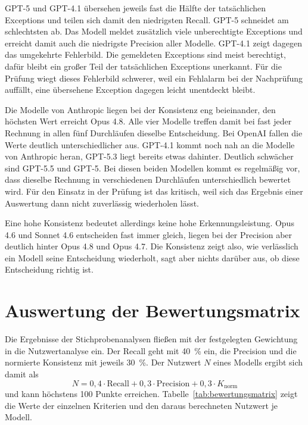 GPT-5 und GPT-4.1 übersehen jeweils fast die Hälfte der tatsächlichen Exceptions und teilen sich damit den niedrigsten Recall. GPT-5 schneidet am schlechtsten ab. Das Modell meldet zusätzlich viele unberechtigte Exceptions und erreicht damit auch die niedrigste Precision aller Modelle. GPT-4.1 zeigt dagegen das umgekehrte Fehlerbild. Die gemeldeten Exceptions sind meist berechtigt, dafür bleibt ein großer Teil der tatsächlichen Exceptions unerkannt. Für die Prüfung wiegt dieses Fehlerbild schwerer, weil ein Fehlalarm bei der Nachprüfung auffällt, eine übersehene Exception dagegen leicht unentdeckt bleibt.

Die Modelle von Anthropic liegen bei der Konsistenz eng beieinander, den höchsten Wert erreicht Opus 4.8. Alle vier Modelle treffen damit bei fast jeder Rechnung in allen fünf Durchläufen dieselbe Entscheidung. Bei OpenAI fallen die Werte deutlich unterschiedlicher aus. GPT-4.1 kommt noch nah an die Modelle von Anthropic heran, GPT-5.3 liegt bereits etwas dahinter. Deutlich schwächer sind GPT-5.5 und GPT-5. Bei diesen beiden Modellen kommt es regelmäßig vor, dass dieselbe Rechnung in verschiedenen Durchläufen unterschiedlich bewertet wird. Für den Einsatz in der Prüfung ist das kritisch, weil sich das Ergebnis einer Auswertung dann nicht zuverlässig wiederholen lässt.

Eine hohe Konsistenz bedeutet allerdings keine hohe Erkennungsleistung. Opus 4.6 und Sonnet 4.6 entscheiden fast immer gleich, liegen bei der Precision aber deutlich hinter Opus 4.8 und Opus 4.7. Die Konsistenz zeigt also, wie verlässlich ein Modell seine Entscheidung wiederholt, sagt aber nichts darüber aus, ob diese Entscheidung richtig ist.

\section{Auswertung der Bewertungsmatrix}
\label{sec:auswertung_bewertungsmatrix}

Die Ergebnisse der Stichprobenanalysen fließen mit der festgelegten Gewichtung in die Nutzwertanalyse ein. Der Recall geht mit 40~\% ein, die Precision und die normierte Konsistenz mit jeweils 30~\%. Der Nutzwert $N$ eines Modells ergibt sich damit als
\begin{equation}
  N = 0{,}4 \cdot \text{Recall} + 0{,}3 \cdot \text{Precision} + 0{,}3 \cdot K_{\text{norm}}
\end{equation}
und kann höchstens 100 Punkte erreichen. Tabelle~\ref{tab:bewertungsmatrix} zeigt die Werte der einzelnen Kriterien und den daraus berechneten Nutzwert je Modell.


